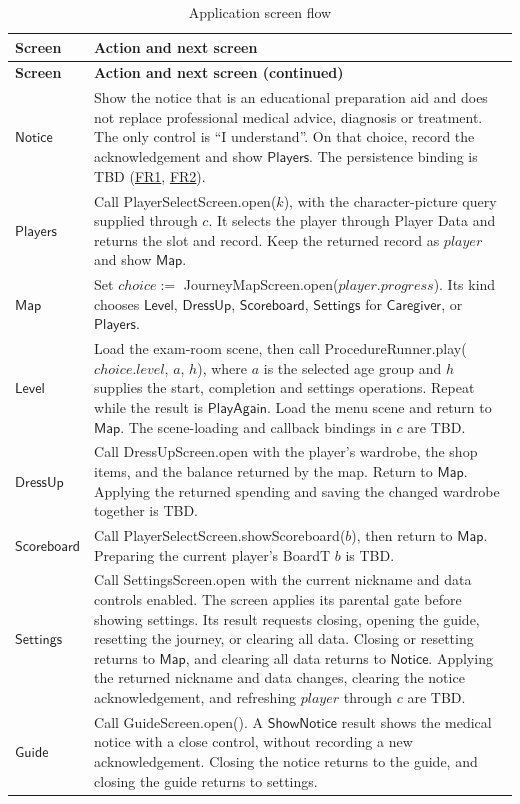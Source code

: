 \documentclass[10pt, titlepage]{article}
\newcommand{\srsurl}{https://team-hindsight.github.io/ophthamology-game/SRS/SRS.pdf}
\newcommand{\srsitemref}[2]{\href{\srsurl\#nameddest=#1}{#2}}
\newcommand{\T}[1]{\mathit{#1}}          %
\newcommand{\V}[1]{\mathsf{#1}}          %
\begin{document}
\begingroup
\small
\renewcommand{\arraystretch}{1.2}
\begin{longtable}{@{}p{}p{}@{}}
\caption{Application screen flow}\label{TblApplicationFlow}\\
\toprule
\textbf{Screen} & \textbf{Action and next screen}\\
\midrule
\endfirsthead
\toprule
\textbf{Screen} & \textbf{Action and next screen (continued)}\\
\midrule
\endhead
\bottomrule
\endfoot
$\V{Notice}$ & Show the notice that \progname{} is an educational
preparation aid and does not replace professional medical advice,
diagnosis or treatment. The only control is ``I understand''. On that
choice, record the acknowledgement and show $\V{Players}$. The
persistence binding is TBD (\srsitemref{FR_MedicalNotice}{FR1},
\srsitemref{FR_RecordAck}{FR2}).\\[0.4em]
$\V{Players}$ & Call PlayerSelectScreen.open($k$), with the character-picture
query supplied through $c$. It selects the player
through Player Data and returns the slot and record. Keep the returned
record as $\T{player}$ and show $\V{Map}$.\\[0.4em]
$\V{Map}$ & Set $\T{choice} :=$
JourneyMapScreen.open($\T{player}.\T{progress}$). Its kind chooses
$\V{Level}$, $\V{DressUp}$, $\V{Scoreboard}$, $\V{Settings}$
for $\V{Caregiver}$, or $\V{Players}$.\\[0.4em]
$\V{Level}$ & Load the exam-room scene, then call
ProcedureRunner.play($\T{choice}.\T{level}$, $a$, $h$), where $a$
is the selected age group and $h$ supplies the start, completion and
settings operations. Repeat while the result is $\V{PlayAgain}$.
Load the menu scene and return to $\V{Map}$. The scene-loading and
callback bindings in $c$ are TBD.\\[0.4em]
$\V{DressUp}$ & Call DressUpScreen.open with the player's wardrobe,
the shop items, and the balance returned by the map. Return to
$\V{Map}$. Applying the returned spending and saving the changed
wardrobe together is TBD.\\[0.4em]
$\V{Scoreboard}$ & Call PlayerSelectScreen.showScoreboard($b$), then
return to $\V{Map}$. Preparing the current player's BoardT $b$ is TBD.\\[0.4em]
$\V{Settings}$ & Call SettingsScreen.open with the current nickname
and data controls enabled. The screen applies its parental gate before
showing settings. Its result requests closing, opening the guide,
resetting the journey, or clearing all data. Closing or resetting returns
to $\V{Map}$, and clearing all data returns to $\V{Notice}$. Applying the
returned nickname and data changes, clearing the notice acknowledgement,
and refreshing $\T{player}$ through $c$ are TBD.\\[0.4em]
$\V{Guide}$ & Call GuideScreen.open(). A $\V{ShowNotice}$ result
shows the medical notice with a close control, without recording a new
acknowledgement. Closing the notice returns to the guide, and closing the
guide returns to settings.\\
\end{longtable}
\endgroup
\end{document}
